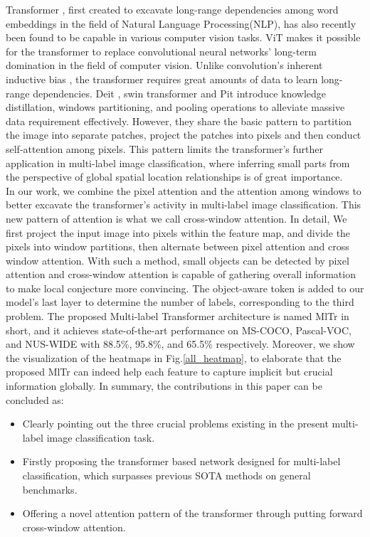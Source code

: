 \documentclass{article} \usepackage[numbers,sort&compress]{natbib}
\begin{document}
Transformer \cite{vaswani2017attention,devlin2018bert}, first created to excavate long-range dependencies among word embeddings in the field of Natural Language Processing(NLP), has also recently been found to be capable in various computer vision tasks. ViT \cite{dosovitskiy2020image} makes it possible for the transformer to replace convolutional neural networks' long-term domination in the field of computer vision. Unlike convolution's inherent inductive bias \cite{battaglia2018relational}, the transformer requires great amounts of data to learn long-range dependencies. Deit \cite{touvron2020training}, swin transformer \cite{liu2021swin} and Pit \cite{heo2021rethinking} introduce knowledge distillation, windows partitioning, and pooling operations to alleviate massive data requirement 
effectively. However, they share the basic pattern to partition the image into separate patches, project the patches into pixels and then conduct self-attention among pixels. This pattern limits the transformer's further application in multi-label image classification, where inferring small parts from the perspective of global spatial location relationships is of great importance. \\
In our work, we combine the pixel attention and the attention among windows to better excavate the transformer's activity in multi-label image classification. This new pattern of attention is what we call cross-window attention. In detail, We first project the input image into pixels within the feature map, and divide the pixels into window partitions, then alternate between pixel attention and 
cross window attention. With such a method, small objects can be detected by pixel attention and cross-window attention is capable of gathering overall information to make local conjecture more convincing. The object-aware token is added to our model's last layer to determine the number of labels, corresponding to the third problem. The proposed Multi-label Transformer architecture is named MlTr in short, and it achieves state-of-the-art performance on MS-COCO, Pascal-VOC, and NUS-WIDE with 88.5\%, 95.8\%, and 65.5\% respectively. Moreover, we show the visualization of the heatmaps in Fig.\ref{all_heatmap}, to elaborate that the proposed MlTr can indeed help each feature to capture implicit but crucial information globally. In summary, the contributions in this paper can be concluded as:
\begin{itemize}
\item Clearly pointing out the three crucial problems existing in the present multi-label image classification task.
\item Firstly proposing the transformer based network designed for multi-label classification, which surpasses previous SOTA methods on general benchmarks.
\item Offering a novel attention pattern of the transformer through putting forward cross-window attention.
\end{itemize}
\end{document}
